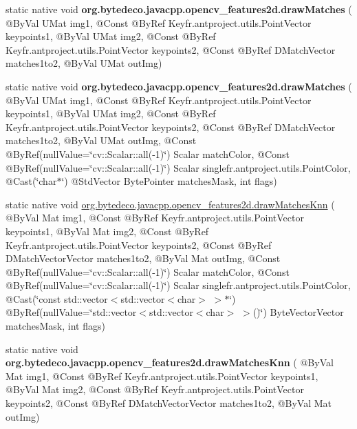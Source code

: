 \begin{DoxyCompactItemize}
static native void {\bfseries org.\+bytedeco.\+javacpp.\+opencv\+\_\+features2d.\+draw\+Matches} ( @By\+Val U\+Mat img1, @Const @By\+Ref Key\+fr.antproject.utils.Point\+Vector keypoints1, @By\+Val U\+Mat img2, @Const @By\+Ref Key\+fr.antproject.utils.Point\+Vector keypoints2, @Const @By\+Ref D\+Match\+Vector matches1to2, @By\+Val U\+Mat out\+Img)
\item 
\mbox{\label{group__features2d__draw_gabfbc5fb5f7d6adacedf1844020fbce3d}} 
static native void {\bfseries org.\+bytedeco.\+javacpp.\+opencv\+\_\+features2d.\+draw\+Matches} ( @By\+Val U\+Mat img1, @Const @By\+Ref Key\+fr.antproject.utils.Point\+Vector keypoints1, @By\+Val U\+Mat img2, @Const @By\+Ref Key\+fr.antproject.utils.Point\+Vector keypoints2, @Const @By\+Ref D\+Match\+Vector matches1to2, @By\+Val U\+Mat out\+Img, @Const @By\+Ref(null\+Value=\char`\"{}cv\+::\+Scalar\+::all(-\/1)\char`\"{}) Scalar match\+Color, @Const @By\+Ref(null\+Value=\char`\"{}cv\+::\+Scalar\+::all(-\/1)\char`\"{}) Scalar single\+fr.antproject.utils.Point\+Color, @Cast(\char`\"{}char$\ast$\char`\"{}) @Std\+Vector Byte\+Pointer matches\+Mask, int flags)
\item 
static native void \hyperlink{group__features2d__draw_ga685267fdd3340d65fba4cf402d6dbe04}{org.\+bytedeco.\+javacpp.\+opencv\+\_\+features2d.\+draw\+Matches\+Knn} ( @By\+Val Mat img1, @Const @By\+Ref Key\+fr.antproject.utils.Point\+Vector keypoints1, @By\+Val Mat img2, @Const @By\+Ref Key\+fr.antproject.utils.Point\+Vector keypoints2, @Const @By\+Ref D\+Match\+Vector\+Vector matches1to2, @By\+Val Mat out\+Img, @Const @By\+Ref(null\+Value=\char`\"{}cv\+::\+Scalar\+::all(-\/1)\char`\"{}) Scalar match\+Color, @Const @By\+Ref(null\+Value=\char`\"{}cv\+::\+Scalar\+::all(-\/1)\char`\"{}) Scalar single\+fr.antproject.utils.Point\+Color, @Cast(\char`\"{}const std\+::vector$<$std\+::vector$<$char$>$ $>$$\ast$\char`\"{}) @By\+Ref(null\+Value=\char`\"{}std\+::vector$<$std\+::vector$<$char$>$ $>$()\char`\"{}) Byte\+Vector\+Vector matches\+Mask, int flags)
\item 
\mbox{\label{group__features2d__draw_ga92c9b6aad2c7b0bf85ce4050cee96f35}} 
static native void {\bfseries org.\+bytedeco.\+javacpp.\+opencv\+\_\+features2d.\+draw\+Matches\+Knn} ( @By\+Val Mat img1, @Const @By\+Ref Key\+fr.antproject.utils.Point\+Vector keypoints1, @By\+Val Mat img2, @Const @By\+Ref Key\+fr.antproject.utils.Point\+Vector keypoints2, @Const @By\+Ref D\+Match\+Vector\+Vector matches1to2, @By\+Val Mat out\+Img)
$$
\end{DoxyCompactItemize}
